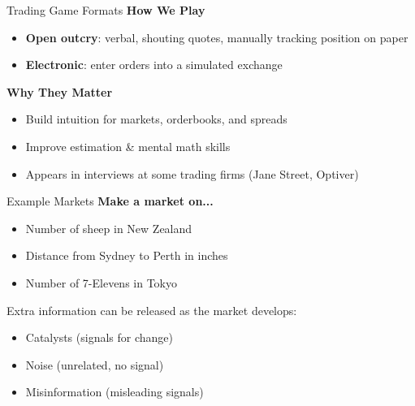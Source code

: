 \begin{frame}{Trading Game Formats}
  \textbf{How We Play}
  \begin{itemize}
    \item \textbf{Open outcry}: verbal, shouting quotes, manually tracking position on paper
    \item \textbf{Electronic}: enter orders into a simulated exchange
  \end{itemize}

  \vspace{0.3cm}
  \textbf{Why They Matter}
  \begin{itemize}
    \item Build intuition for markets, orderbooks, and spreads
    \item Improve estimation \& mental math skills
    \item Appears in interviews at some trading firms (Jane Street, Optiver)
  \end{itemize}
\end{frame}

\begin{frame}{Example Markets}
  \textbf{Make a market on...}
  \begin{itemize}
    \item Number of sheep in New Zealand
    \item Distance from Sydney to Perth in inches
    \item Number of 7-Elevens in Tokyo
  \end{itemize}

  \vspace{0.3cm}
  Extra information can be released as the market develops: 
  \begin{itemize}
    \item Catalysts (signals for change) 
    \item Noise (unrelated, no signal)
    \item Misinformation (misleading signals) 
  \end{itemize}

  \vspace{0.3cm}
\end{frame}

